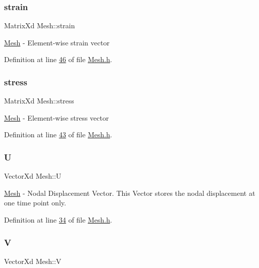 \subsubsection{\texorpdfstring{strain}{strain}}
{\footnotesize\ttfamily Matrix\+Xd Mesh\+::strain\hspace{0.3cm}{\ttfamily [private]}}

\hyperlink{class_mesh}{Mesh} -\/ Element-\/wise strain vector 

Definition at line \hyperlink{_mesh_8h_source_l00046}{46} of file \hyperlink{_mesh_8h_source}{Mesh.\+h}.

\mbox{\label{class_mesh_ae8f28f2627eeb9eccd9adcbdee1b2aa9}} 
\subsubsection{\texorpdfstring{stress}{stress}}
{\footnotesize\ttfamily Matrix\+Xd Mesh\+::stress\hspace{0.3cm}{\ttfamily [private]}}

\hyperlink{class_mesh}{Mesh} -\/ Element-\/wise stress vector 

Definition at line \hyperlink{_mesh_8h_source_l00043}{43} of file \hyperlink{_mesh_8h_source}{Mesh.\+h}.

\mbox{\label{class_mesh_a950948f115bf07df771fa277042eedc1}} 
\subsubsection{\texorpdfstring{U}{U}}
{\footnotesize\ttfamily Vector\+Xd Mesh\+::U\hspace{0.3cm}{\ttfamily [private]}}

\hyperlink{class_mesh}{Mesh} -\/ Nodal Displacement Vector. This Vector stores the nodal displacement at one time point only. 

Definition at line \hyperlink{_mesh_8h_source_l00034}{34} of file \hyperlink{_mesh_8h_source}{Mesh.\+h}.

\mbox{\label{class_mesh_a69a99942ef6672d74a7ba569bdbd3c83}} 
\subsubsection{\texorpdfstring{V}{V}}
{\footnotesize\ttfamily Vector\+Xd Mesh\+::V\hspace{0.3cm}{\ttfamily [private]}}

